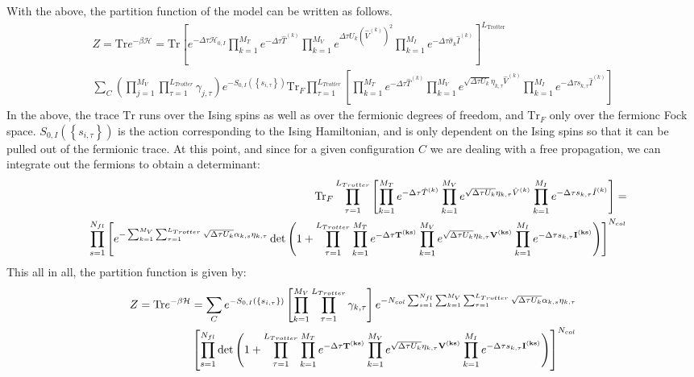 With the above, the partition function of the model can be written as follows.
\begin{eqnarray}
Z = \text {Tr}   e^{-\beta \mathcal{H} } =   \text {Tr}  \left[ e^{-\Delta \tau \mathcal{H}_{0,I}}   \prod_{k=1}^{M_T}   e^{-\Delta \tau \hat{T}^{(k)}}  
    \prod_{k=1}^{M_V}   e^{  \Delta \tau  U_k \left(  \hat{V}^{(k)} \right)^2}   \prod_{k=1}^{M_I}   e^{  -\Delta \tau  \hat{\sigma}_{k}  \hat{I}^{(k)}} 
   \right]^{L_{\text{Trotter}}}  \nonumber \\
   \sum_{C} \left( \prod_{j=1}^{M_V} \prod_{\tau=1}^{L_{Trotter}} \gamma_{j,\tau} \right) e^{-S_{0,I} \left( \left\{ s_{i,\tau} \right\}  \right) } 
    \text {Tr}_{F}   \prod_{\tau=1}^{L_{Trotter}} \left[   \prod_{k=1}^{M_T}   e^{-\Delta \tau \hat{T}^{(k)}}  
    \prod_{k=1}^{M_V}   e^{  \sqrt{ \Delta \tau  U_k} \eta_{k,\tau} \hat{V}^{(k)} }   \prod_{k=1}^{M_I}   e^{  -\Delta \tau s_{k,\tau}  \hat{I}^{(k)}}  \right] \nonumber
\end{eqnarray}
In the above,  the trace $\text {Tr} $  runs over the Ising spins as well as over the fermionic degrees of freedom, and $ \text {Tr}_{F}  $ only over the  fermionc Fock space. 
$S_{0,I} \left( \left\{ s_{i,\tau} \right\}  \right)  $ is the action  corresponding to the Ising Hamiltonian,  and is only dependent on the Ising spins so that  it can be pulled out of the fermionic trace.
At this point,  and  since for a given configuration $C$  we are dealing with a free propagation, we can integrate out the fermions to obtain a determinant: 
\begin{eqnarray}
& &  \text {Tr}_{F}   \prod_{\tau=1}^{L_{Trotter}} \left[   \prod_{k=1}^{M_T}   e^{-\Delta \tau \hat{T}^{(k)}}  
    \prod_{k=1}^{M_V}   e^{  \sqrt{ \Delta \tau  U_k} \eta_{k,\tau} \hat{V}^{(k)} }   \prod_{k=1}^{M_I}   e^{  -\Delta \tau s_{k,\tau}  \hat{I}^{(k)}}  \right]  =   \\
&&    \prod_{s=1}^{N_{fl}} \left[  e^{- \sum_{k=1}^{M_V} \sum_{\tau = 1}^{L_{Trotter}}\sqrt{\Delta \tau U_k}  \alpha_{k,s} \eta_{k,\tau} } \det\left(  1 + 
     \prod_{\tau=1}^{L_{Trotter}}   \prod_{k=1}^{M_T}   e^{-\Delta \tau \bf{T}^{(ks)}}  
    \prod_{k=1}^{M_V}   e^{  \sqrt{ \Delta \tau  U_k} \eta_{k,\tau} \bf{V}^{(ks)} }   \prod_{k=1}^{M_I}   e^{  -\Delta \tau s_{k,\tau}  \bf{I}^{(ks)}}  
     \right) \right]^{N_{col}}  \nonumber 
\end{eqnarray}
This all in all, the partition function is given by:
\begin{eqnarray}
	Z = \text {Tr}   e^{-\beta \mathcal{H} }  =   \sum_{C}   e^{-S_{0,I} \left( \left\{ s_{i,\tau} \right\}  \right) }     \left[ \prod_{k=1}^{M_V} \prod_{\tau=1}^{L_{Trotter}} \gamma_{k,\tau} \right] 
	  e^{- N_{col }\sum_{s=1}^{N_{fl}} \sum_{k=1}^{M_V} \sum_{\tau = 1}^{L_{Trotter}}\sqrt{\Delta \tau U_k}  \alpha_{k,s} \eta_{k,\tau} }   \nonumber \\
	   \left[   \prod_{s=1}^{N_{fl}}\det\left(  1 + 
     \prod_{\tau=1}^{L_{Trotter}}   \prod_{k=1}^{M_T}   e^{-\Delta \tau \bf{T}^{(ks)}}  
    \prod_{k=1}^{M_V}   e^{  \sqrt{ \Delta \tau  U_k} \eta_{k,\tau} \bf{V}^{(ks)} }   \prod_{k=1}^{M_I}   e^{  -\Delta \tau s_{k,\tau}  \bf{I}^{(ks)}}  
     \right) \right]^{N_{col}} 
\end{eqnarray}

